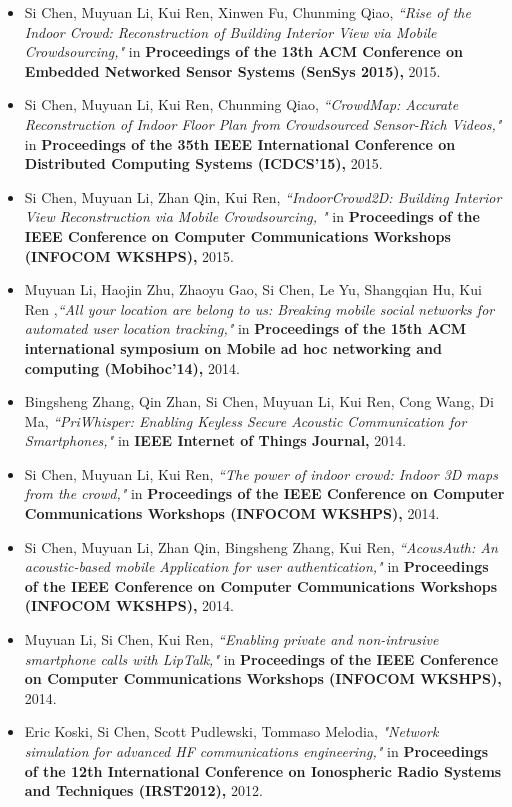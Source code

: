 \documentclass[a4paper, 11pt]{article}
\makeatletter
\newcommand{\ressection}[1]
{\fcolorbox{black}{shadecolor}{\vbox{\hsize 0.98\textwidth \textbf{\mbox{~}{\@ \large #1} \vphantom{p\^{E}}}}}}
\makeatother
\begin{document}
\ressection{Publications}
\begin{itemize}
\item 
Si Chen, Muyuan Li, Kui Ren, Xinwen Fu, Chunming Qiao, \emph{``Rise of the Indoor Crowd: Reconstruction of Building Interior View via Mobile Crowdsourcing,"} in \textbf{Proceedings of the 13th ACM Conference on Embedded Networked Sensor Systems (SenSys 2015),} 2015.
\item 
Si Chen, Muyuan Li, Kui Ren, Chunming Qiao, \emph{``CrowdMap: Accurate Reconstruction of Indoor Floor Plan from Crowdsourced Sensor-Rich Videos,"} in \textbf{Proceedings of the 35th IEEE International Conference on Distributed Computing Systems (ICDCS'15),} 2015.
\item
Si Chen, Muyuan Li, Zhan Qin, Kui Ren, \emph{``IndoorCrowd2D: Building Interior View Reconstruction via Mobile Crowdsourcing, "} in \textbf{Proceedings of the IEEE Conference on Computer Communications Workshops (INFOCOM WKSHPS),} 2015.
\item 
Muyuan Li, Haojin Zhu, Zhaoyu Gao, Si Chen, Le Yu, Shangqian Hu, Kui Ren ,\emph{``All your location are belong to us: Breaking mobile social networks for automated user location tracking,"} in \textbf{Proceedings of the 15th ACM international symposium on Mobile ad hoc networking and computing (Mobihoc'14),} 2014.
\item 
Bingsheng Zhang, Qin Zhan, Si Chen, Muyuan Li, Kui Ren, Cong Wang, Di Ma, \emph{``PriWhisper: Enabling Keyless Secure Acoustic Communication for Smartphones,"} in \textbf{IEEE Internet of Things Journal,} 2014.
\item 
Si Chen, Muyuan Li, Kui Ren, \emph{``The power of indoor crowd: Indoor 3D maps from the crowd,"} in \textbf{Proceedings of the IEEE Conference on Computer Communications Workshops (INFOCOM WKSHPS),} 2014.
\item 
Si Chen, Muyuan Li, Zhan Qin, Bingsheng Zhang, Kui Ren, \emph{``AcousAuth: An acoustic-based mobile Application for user authentication,"} in \textbf{Proceedings of the IEEE Conference on Computer Communications Workshops (INFOCOM WKSHPS),} 2014.
\item 
Muyuan Li, Si Chen, Kui Ren, \emph{``Enabling private and non-intrusive smartphone calls with LipTalk,"} in \textbf{Proceedings of the IEEE Conference on Computer Communications Workshops (INFOCOM WKSHPS),}  2014.
\item 
Eric Koski, Si Chen, Scott Pudlewski, Tommaso Melodia, \emph{"Network simulation for advanced HF communications engineering,"} in \textbf{Proceedings of the 12th International Conference on Ionospheric Radio Systems and Techniques (IRST2012),} 2012.

\end{itemize}
\end{document}
